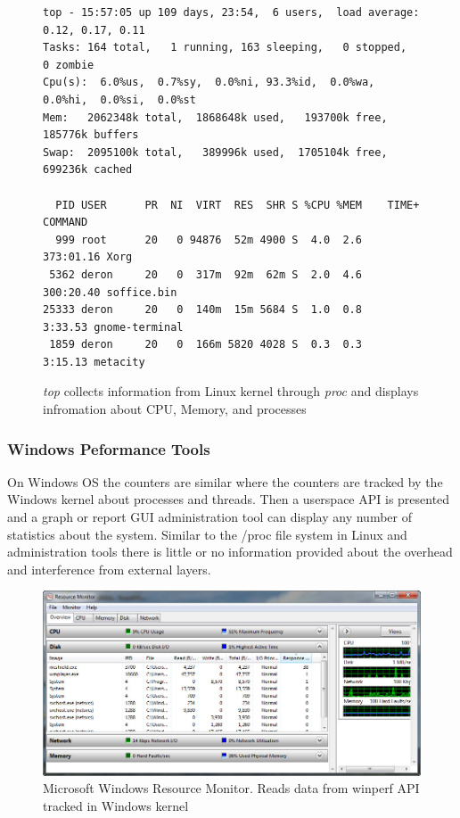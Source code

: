 \begin{figure}[h]
\begin{Verbatim}
top - 15:57:05 up 109 days, 23:54,  6 users,  load average: 0.12, 0.17, 0.11
Tasks: 164 total,   1 running, 163 sleeping,   0 stopped,   0 zombie
Cpu(s):  6.0%us,  0.7%sy,  0.0%ni, 93.3%id,  0.0%wa,  0.0%hi,  0.0%si,  0.0%st
Mem:   2062348k total,  1868648k used,   193700k free,   185776k buffers
Swap:  2095100k total,   389996k used,  1705104k free,   699236k cached

  PID USER      PR  NI  VIRT  RES  SHR S %CPU %MEM    TIME+  COMMAND            
  999 root      20   0 94876  52m 4900 S  4.0  2.6 373:01.16 Xorg               
 5362 deron     20   0  317m  92m  62m S  2.0  4.6 300:20.40 soffice.bin        
25333 deron     20   0  140m  15m 5684 S  1.0  0.8   3:33.53 gnome-terminal     
 1859 deron     20   0  166m 5820 4028 S  0.3  0.3   3:15.13 metacity           
\end{Verbatim}
\caption{\emph{top} collects information from Linux kernel through \emph{proc} and displays infromation about CPU, Memory, and processes}
\label{fig:top}
\end{figure}

\subsubsection{Windows Peformance Tools}
On Windows OS the counters are similar where the counters are tracked by the Windows kernel about processes and threads.  Then a userspace API \cite{winperf} is presented and a graph or report GUI administration tool can display any number of statistics about the system.  Similar to the /proc file system in Linux and administration tools there is little or no information provided about the overhead and interference from external layers.

\begin{figure}[!h]
  \begin{center}
  \includegraphics[width=6in]{images/ResourceMonitor.jpg}
  \caption{Microsoft Windows Resource Monitor.  Reads data from winperf API tracked in Windows kernel}
  \label{resourceMonitor}
  \end{center}
\end{figure}

